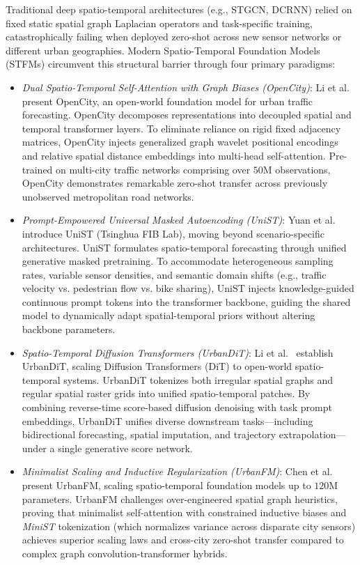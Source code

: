 Traditional deep spatio-temporal architectures (e.g., STGCN, DCRNN) relied on fixed static spatial graph Laplacian operators and task-specific training, catastrophically failing when deployed zero-shot across new sensor networks or different urban geographies. Modern Spatio-Temporal Foundation Models (STFMs) circumvent this structural barrier through four primary paradigms:
\begin{itemize}[leftmargin=*]
    \item \emph{Dual Spatio-Temporal Self-Attention with Graph Biases (OpenCity)}: Li et al.~\cite{li2024opencity} present OpenCity, an open-world foundation model for urban traffic forecasting. OpenCity decomposes representations into decoupled spatial and temporal transformer layers. To eliminate reliance on rigid fixed adjacency matrices, OpenCity injects generalized graph wavelet positional encodings and relative spatial distance embeddings into multi-head self-attention. Pre-trained on multi-city traffic networks comprising over $50\text{M}$ observations, OpenCity demonstrates remarkable zero-shot transfer across previously unobserved metropolitan road networks.
    \item \emph{Prompt-Empowered Universal Masked Autoencoding (UniST)}: Yuan et al.~\cite{yuan2024unist} introduce UniST (Tsinghua FIB Lab), moving beyond scenario-specific architectures. UniST formulates spatio-temporal forecasting through unified generative masked pretraining. To accommodate heterogeneous sampling rates, variable sensor densities, and semantic domain shifts (e.g., traffic velocity vs. pedestrian flow vs. bike sharing), UniST injects knowledge-guided continuous prompt tokens into the transformer backbone, guiding the shared model to dynamically adapt spatial-temporal priors without altering backbone parameters.
    \item \emph{Spatio-Temporal Diffusion Transformers (UrbanDiT)}: Li et al.~\cite{li2024urbandit} establish UrbanDiT, scaling Diffusion Transformers (DiT) to open-world spatio-temporal systems. UrbanDiT tokenizes both irregular spatial graphs and regular spatial raster grids into unified spatio-temporal patches. By combining reverse-time score-based diffusion denoising with task prompt embeddings, UrbanDiT unifies diverse downstream tasks—including bidirectional forecasting, spatial imputation, and trajectory extrapolation—under a single generative score network.
    \item \emph{Minimalist Scaling and Inductive Regularization (UrbanFM)}: Chen et al.~\cite{chen2026urbanfm} present UrbanFM, scaling spatio-temporal foundation models up to $120\text{M}$ parameters. UrbanFM challenges over-engineered spatial graph heuristics, proving that minimalist self-attention with constrained inductive biases and \emph{MiniST} tokenization (which normalizes variance across disparate city sensors) achieves superior scaling laws and cross-city zero-shot transfer compared to complex graph convolution-transformer hybrids.

\end{itemize}
